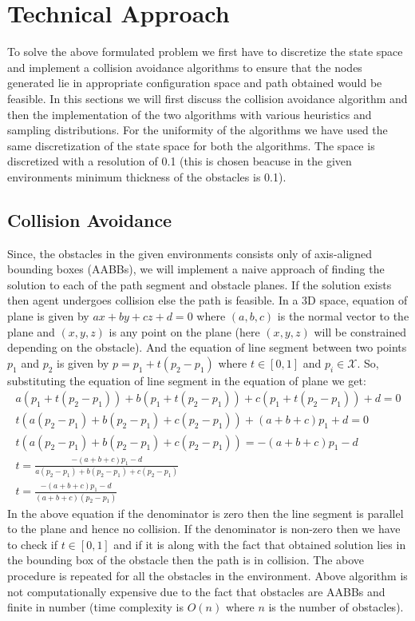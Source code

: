 \documentclass[conference]{IEEEtran}
\begin{document}
\section{Technical Approach}
To solve the above formulated problem we first have to discretize the state space and implement a collision avoidance algorithms 
to ensure that the nodes generated lie in appropriate configuration space and path obtained would be feasible. In this sections we will
first discuss the collision avoidance algorithm and then the implementation of the two algorithms with various heuristics and sampling distributions.
For the uniformity of the algorithms we have used the same discretization of the state space for both the algorithms. The space is 
discretized with a resolution of 0.1 (this is chosen beacuse in the given environments minimum thickness of the obstacles is 0.1).
\subsection{Collision Avoidance}
Since, the obstacles in the given environments consists only of axis-aligned bounding boxes (AABBs), we will implement a naive approach of finding 
the solution to each of the path segment and obstacle planes. If the solution exists then agent undergoes collision else the path is feasible. In a 3D space,
equation of plane is given by $ax + by + cz + d = 0$ where $(a, b, c)$ is the normal vector to the plane and $(x, y, z)$ is any point on the plane (here $(x,y,z)$ will be constrained depending on the obstacle).
And the equation of line segment between two points $p_1$ and $p_2$ is given by $p = p_1 + t(p_2 - p_1)$ where $t \in [0, 1]$ and $p_i \in \mathcal{X}$. So, substituting the equation of line segment in the equation of plane we get:
\begin{multline*}
    a(p_1 + t(p_2 - p_1)) + b(p_1 + t(p_2 - p_1)) + c(p_1 + t(p_2 - p_1)) + d = 0 \\
    t(a(p_2 - p_1) + b(p_2 - p_1) + c(p_2 - p_1)) + (a + b + c)p_1 + d = 0 \\
    t(a(p_2 - p_1) + b(p_2 - p_1) + c(p_2 - p_1)) = -(a + b + c)p_1 - d \\
    t = \frac{-(a + b + c)p_1 - d}{a(p_2 - p_1) + b(p_2 - p_1) + c(p_2 - p_1)} \\
    t = \frac{-(a + b + c)p_1 - d}{(a + b + c)(p_2 - p_1)}
\end{multline*}
In the above equation if the denominator is zero then the line segment is parallel to the plane and hence no collision. 
If the denominator is non-zero then we have to check if $t \in [0, 1]$ and if it is along with the fact that obtained solution 
lies in the bounding box of the obstacle then the path is in collision. The above procedure is repeated for all the obstacles in the environment.
Above algorithm is not computationally expensive due to the fact that obstacles are AABBs and finite in number (time complexity is $O(n)$ where $n$ is the number of obstacles).
\end{document}
